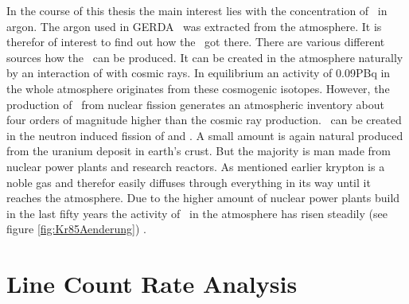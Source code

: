 \documentclass[encoding=utf8,british]{tumphthesis}
\begin{document}
In the course of this thesis the main interest lies with the concentration of \Kr\ in argon.
The argon used in GERDA \PII\ was extracted from the atmosphere.
It is therefor of interest to find out how the \Kr\ got there.
There are various different sources how the \Kr\ can be produced.
It can be created in the atmosphere naturally by an interaction of  with cosmic rays.
In equilibrium an activity of 0.09PBq in the whole atmosphere originates from these cosmogenic isotopes.
However, the production of \Kr\ from nuclear fission generates an atmospheric inventory about four orders of magnitude higher than the cosmic ray production.
\Kr\ can be created in the neutron induced fission of  and .
A small amount is again natural produced from the uranium deposit in earth's crust.
But the majority is man made from nuclear power plants and research reactors.
As mentioned earlier krypton is a noble gas and therefor easily diffuses through everything in its way until it reaches the atmosphere.
Due to the higher amount of nuclear power plants build in the last fifty years the activity of \Kr\ in the atmosphere has risen steadily (see figure \ref{fig:Kr85Aenderung}) \cite{bieringer_trace_2009}.



 
\chapter{Line Count Rate Analysis}
\label{sec:SAfrom514}
\end{document}
